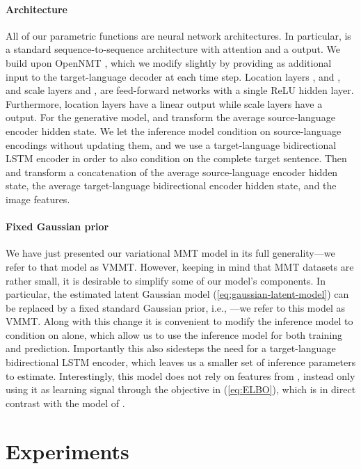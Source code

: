 \documentclass[11pt,a4paper]{article}
\newcommand{\cond}{VMMT\xspace}
\newcommand{\uncond}{VMMT\xspace}
\begin{document}
\paragraph{Architecture} 
All of our parametric functions are neural network architectures. 
In particular,  is a standard sequence-to-sequence architecture with attention and a  output. We build upon OpenNMT \citep{opennmt}, which we modify slightly by providing  as additional input to the target-language decoder at each time step.
Location layers ,  and , and scale layers  and , are feed-forward networks with a single ReLU hidden layer. Furthermore, location layers have a linear output while scale layers have a  output.
For the generative model,  and  transform the average source-language encoder hidden state. We let the inference model condition on source-language encodings without updating them, and we use a target-language bidirectional LSTM encoder in order to also condition on the complete target sentence. Then  and  transform a concatenation of the average source-language encoder hidden state, the average target-language bidirectional encoder hidden state, and the image features.



\paragraph{Fixed Gaussian prior} We have just presented our variational MMT model in its full generality---we refer to that model as \cond. 
However, keeping in mind that MMT datasets are rather small, it is desirable to simplify some of our model's  components. In particular, the estimated latent Gaussian model (\ref{eq:gaussian-latent-model}) can be replaced by a fixed standard Gaussian prior, i.e., ---we refer to this model as \uncond.  Along with this change it is convenient to modify the inference model to condition on  alone, which allow us to use the inference model for both training and prediction. Importantly this also sidesteps the need for a target-language bidirectional LSTM encoder, which leaves us a smaller set of inference parameters  to estimate. Interestingly, this model does not rely on features from , instead only using it as learning signal through the objective in (\ref{eq:ELBO}), which is in direct contrast with the model of \citet{Toyamaetal2016}.
 \section{Experiments}\label{sec:exp}
\end{document}
